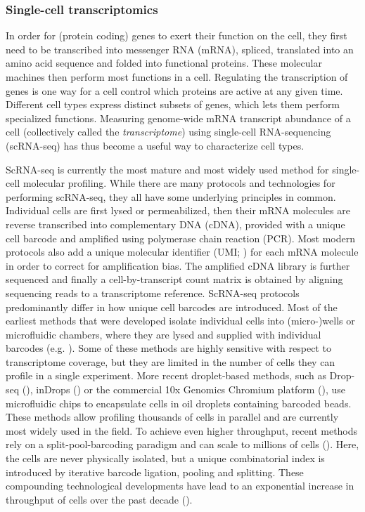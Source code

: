\subsubsection{Single-cell transcriptomics}

In order for (protein coding) genes to exert their function on the cell, they first need to be transcribed into messenger RNA (mRNA), spliced, translated into an amino acid sequence and folded into functional proteins. These molecular machines then perform most functions in a cell. Regulating the transcription of genes is one way for a cell control which proteins are active at any given time. Different cell types express distinct subsets of genes, which lets them perform specialized functions. Measuring genome-wide mRNA transcript abundance of a cell (collectively called the \textit{transcriptome}) using single-cell RNA-sequencing (scRNA-seq) has thus become a useful way to characterize cell types. 

ScRNA-seq is currently the most mature and most widely used method for single-cell molecular profiling. While there are many protocols and technologies for performing scRNA-seq, they all have some underlying principles in common. Individual cells are first lysed or permeabilized, then their mRNA molecules are reverse transcribed into complementary DNA (cDNA), provided with a unique cell barcode and amplified using polymerase chain reaction (PCR). Most modern protocols also add a unique molecular identifier (UMI; \cite{islam_quantitative_2014}) for each mRNA molecule in order to correct for amplification bias. The amplified cDNA library is further sequenced and finally a cell-by-transcript count matrix is obtained by aligning sequencing reads to a transcriptome reference. ScRNA-seq protocols predominantly differ in how unique cell barcodes are introduced. Most of the earliest methods that were developed isolate individual cells into (micro-)wells or microfluidic chambers, where they are lysed and supplied with individual barcodes (e.g. \cite{picelli_smart-seq2_2013,shalek_single-cell_2014,jaitin_massively_2014,treutlein_reconstructing_2014}). Some of these methods are highly sensitive with respect to transcriptome coverage, but they are limited in the number of cells they can profile in a single experiment. More recent droplet-based methods, such as Drop-seq (\cite{macosko_highly_2015}), inDrops (\cite{klein_droplet_2015}) or the commercial 10x Genomics Chromium platform (\cite{zheng_massively_2017}), use microfluidic chips to encapsulate cells in oil droplets containing barcoded beads. These methods allow profiling thousands of cells in parallel and are currently most widely used in the field. To achieve even higher throughput, recent methods rely on a split-pool-barcoding paradigm and can scale to millions of cells (\cite{rosenberg_single-cell_2018,yin_high-throughput_2019,cao_comprehensive_2017}). Here, the cells are never physically isolated, but a unique combinatorial index is introduced by iterative barcode ligation, pooling and splitting. These compounding technological developments have lead to an exponential increase in throughput of cells over the past decade (\cite{svensson_exponential_2018}).

